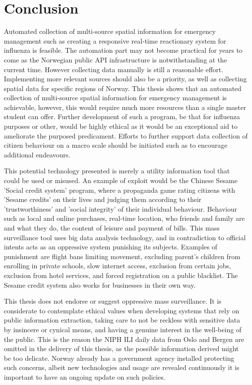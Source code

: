 \section{Conclusion}
Automated collection of multi-source spatial information for emergency management such as creating a responsive real-time reactionary system for influenza is feasible.
The automation part may not become practical for years to come as the Norwegian public API infrastructure is notwithstanding at the current time. However collecting data manually is still a reasonable effort. Implementing more relevant sources should also be a priority, as well as collecting spatial data for specific regions of Norway. 
This thesis shows that an automated collection of multi-source spatial information for emergency management is achievable, however, this would require much more resources than a single master student can offer. Further development of such a program, be that for influenza purposes or other, would be highly ethical as it would be an exceptional aid to ameliorate the purposed predicament. Efforts to further support data collection of citizen behaviour on a macro scale should be initiated such as to encourage additional endeavours.

This potential technology presented is merely a utility information tool that could be used or misused. An example of exploit would be the Chinese Sesame 'Social credit system' program\cite{meissner2017china}\cite{china_botsman}\cite{china_wiki}, where a propaganda game rating citizens with 'Sesame credits' on their lives and judging them according to their 'trustworthiness' and 'social integrity' of their individual behaviour. Behaviour such as local and online purchases, real-time location, who friends and family are and what they do, the content of leisure and payment of bills. This mass surveillance tool uses big data analysis technology, and in contradiction to official intents acts as an oppressive system punishing its subjects. Examples of punishment are flight bans limiting movement, excluding parent's children from enrolling in private schools, slow internet access, exclusion from certain jobs, exclusion from hotel services, and forced registration on a public blacklist. The Sesame credit system also works for businesses in their own way.

This thesis does not endorse or suggest oppressive mass surveillance. It is considerate to contemplate ethical values when developing systems that rely on public information extraction, taking care to not be reckless with sensitive data by insincere or cynical means, and having a genuine interest in the well-being of the public. This is the reason the NIPH ILI daily data from Oslo and Bergen are omitted in the delivery of this thesis, as the possible information derived might be too delicate. Norway already has a government agency installed protecting such concerns\cite{datatilsynet}, albeit new technologies and usage are revealed continuously it is important to have an ongoing update on such policies.


